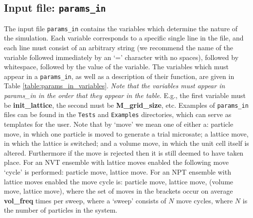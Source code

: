 \documentclass{report}
\begin{document}
\subsection{Input file: \texttt{params\_in}}\label{section:params_in}
The input file \texttt{params\_in} contains the variables which determine the nature of the simulation. Each variable corresponds to a
specific single line in the file, and each line must consist of an arbitrary string (we recommend the name of the variable followed immediately
by an `=' character with no spaces), followed by whitespace, followed by the value of the variable. The variables which must appear
in a \texttt{params\_in}, as well as a description of their function, are given in Table \ref{table:params_in_variables}. 
\emph{Note that the variables must appear in params\_in in the order that they appear in the table}. E.g., the first 
variable must be \textbf{init\_lattice}, the second must be \textbf{M\_grid\_size}, etc. Examples of \texttt{params\_in} files can
be found in the \texttt{Tests} and \texttt{Examples} directories, which can serve as templates for the user.
%
Note that by `move' we mean one of either a: particle move, in which one particle is moved to generate a trial microsate; a lattice move, in 
which the lattice is switched; and a volume move, in which the unit cell itself is altered. Furthermore if the move is rejected then it is 
still deemed to have taken place. For an NVT ensemble with lattice moves enabled the following move `cycle' is performed: particle move, 
lattice move. For an NPT ensemble with lattice moves enabled the move cycle is: particle move, lattice move, (volume move, lattice move), 
where the set of moves in the brackets occur on average \textbf{vol\_freq} times per sweep, where a `sweep' consists of $N$ move cycles,
where $N$ is the number of particles in the system.
\end{document}
